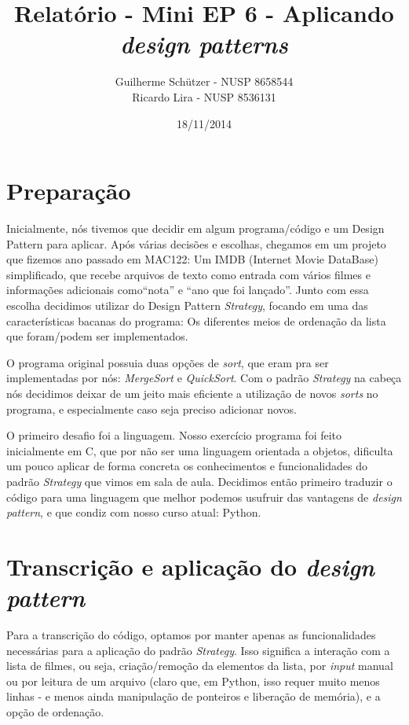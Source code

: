 \documentclass[a4paper]{article}
\title{Relatório - Mini EP 6 - Aplicando \emph{design patterns}}
\author{
Guilherme Schützer - NUSP 8658544 \\
Ricardo Lira       - NUSP 8536131
}
\date{18/11/2014}
\begin{document}
\maketitle

\section{Preparação}


	Inicialmente, nós tivemos que decidir em algum programa/código e um Design Pattern
para aplicar. Após várias decisões e escolhas, chegamos em um projeto que fizemos
ano passado em MAC122: Um IMDB (Internet Movie DataBase) simplificado, que recebe
arquivos de texto como entrada com vários filmes e informações adicionais como``nota''
e ``ano que foi lançado''. Junto com essa escolha decidimos utilizar do Design Pattern \emph{Strategy}, focando em uma das características bacanas do programa: Os diferentes meios de ordenação da lista que foram/podem ser implementados.

	O programa original possuia duas opções de \emph{sort}, que eram pra ser implementadas por nós: \emph{MergeSort} e \emph{QuickSort}. Com o padrão \emph{Strategy} na cabeça nós decidimos deixar de um jeito mais eficiente a utilização de novos \emph{sorts} no programa, e especialmente caso seja preciso adicionar novos.

	O primeiro desafio foi a linguagem. Nosso exercício programa foi feito inicialmente em C,
que por não ser uma linguagem orientada a objetos, dificulta um pouco aplicar de forma concreta os conhecimentos e funcionalidades do padrão \emph{Strategy} que vimos em sala de aula. Decidimos então primeiro traduzir o código para uma linguagem que melhor podemos usufruir das vantagens de \emph{design pattern}, e que condiz com nosso curso atual: Python.

\newpage

\section{Transcrição e aplicação do \emph{design pattern}}

	Para a transcrição do código, optamos por manter apenas as funcionalidades necessárias para a aplicação do padrão \emph{Strategy}. Isso significa a interação com a lista de filmes, ou seja, criação/remoção da elementos da lista, por \emph{input} manual ou por leitura de um arquivo (claro que, em Python, isso requer muito menos linhas - e menos ainda manipulação de
	ponteiros e liberação de memória), e a opção de ordenação.
\end{document}

